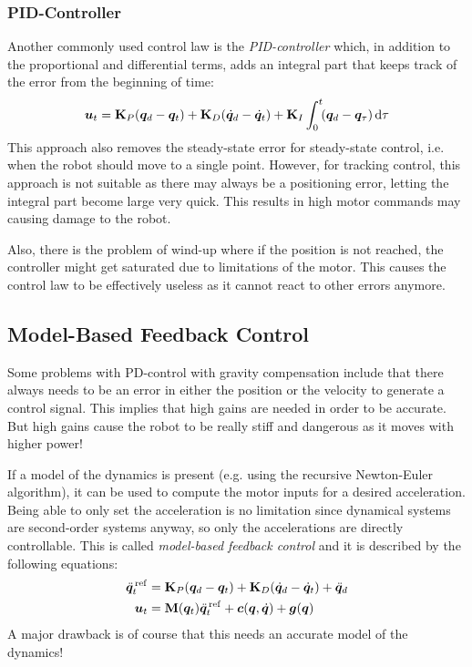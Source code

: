 			\subsubsection{PID-Controller}
				Another commonly used control law is the \emph{PID-controller} which, in addition to the proportional and differential terms, adds an integral part that keeps track of the error from the beginning of time:
				\begin{equation*}
					\bm{u}_t = \bm{\mathrm{K}}_P (\bm{q}_d - \bm{q}_t) + \bm{\mathrm{K}}_D (\dot{\bm{q}}_d - \dot{\bm{q}}_t) + \bm{\mathrm{K}}_I \int_0^t \! (\bm{q}_d - \bm{q}_\tau) \dd{\tau}
				\end{equation*}
				This approach also removes the steady-state error for steady-state control, i.e. when the robot should move to a single point. However, for tracking control, this approach is not suitable as there may always be a positioning error, letting the integral part become large very quick. This results in high motor commands may causing damage to the robot.

				Also, there is the problem of wind-up where if the position is not reached, the controller might get saturated due to limitations of the motor. This causes the control law to be effectively useless as it cannot react to other errors anymore.

		\subsection{Model-Based Feedback Control}
			Some problems with PD-control with gravity compensation include that there always needs to be an error in either the position or the velocity to generate a control signal. This implies that high gains are needed in order to be accurate. But high gains cause the robot to be really stiff and dangerous as it moves with higher power!

			If a model of the dynamics is present (e.g. using the recursive Newton-Euler algorithm), it can be used to compute the motor inputs for a desired acceleration. Being able to only set the acceleration is no limitation since dynamical systems are second-order systems anyway, so only the accelerations are directly controllable. This is called \emph{model-based feedback control} and it is described by the following equations:
			\begin{align*}
				\ddot{\bm{q}}_t^{\,\mathrm{ref}} &= \bm{\mathrm{K}}_P (\bm{q}_d - \bm{q}_t) + \bm{\mathrm{K}}_D (\dot{\bm{q}}_d - \dot{\bm{q}}_t) + \ddot{\bm{q}}_d \\
				\bm{u}_t &= \bm{\mathrm{M}}(\bm{q}_t) \ddot{\bm{q}}_t^{\,\mathrm{ref}} + \bm{c}(\bm{q}, \dot{\bm{q}}) + \bm{g}(\bm{q})
			\end{align*}
			A major drawback is of course that this needs an accurate model of the dynamics!

